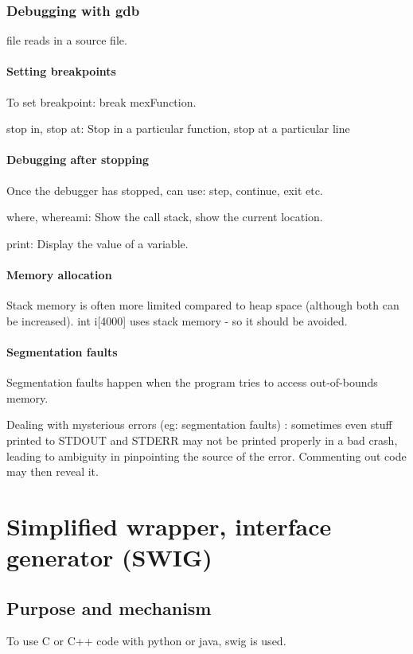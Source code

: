 \documentclass[oneside, article]{memoir}
\begin{document}
\subsection{Debugging with gdb}
file reads in a source file.

\subsubsection{Setting breakpoints}
To set breakpoint: break mexFunction.

stop in, stop at: Stop in a particular function, stop at a particular line

\subsubsection{Debugging after stopping}
Once the debugger has stopped, can use: step, continue, exit etc.

where, whereami: Show the call stack, show the current location.

print: Display the value of a variable.

\subsubsection{Memory allocation}
Stack memory is often more limited compared to heap space (although both can be increased). int i[4000] uses stack memory - so it should be avoided.

\subsubsection{Segmentation faults}
Segmentation faults happen when the program tries to access out-of-bounds memory.

Dealing with mysterious errors (eg: segmentation faults) : sometimes even stuff printed to STDOUT and STDERR may not be printed properly in a bad crash, leading to ambiguity in pinpointing the source of the error. Commenting out code may then reveal it. 

\chapter{Simplified wrapper, interface generator (SWIG)}
\section{Purpose and mechanism}
To use C or C++ code with python or java, swig is used.
\end{document}
